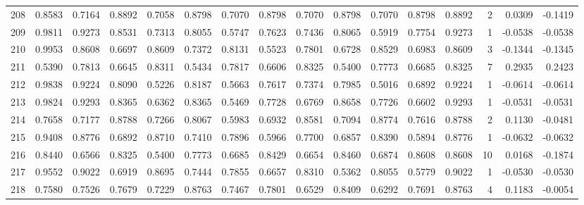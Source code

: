 \begin{tabular}{lrrrrrrrrrrrrrrr}
208 &      0.8583 &  0.7164 &  0.8892 &  0.7058 &  0.8798 &  0.7070 &  0.8798 &  0.7070 &  0.8798 &  0.7070 &   0.8798 &     0.8892 &      2 &                    0.0309 &                    -0.1419 \\
209 &      0.9811 &  0.9273 &  0.8531 &  0.7313 &  0.8055 &  0.5747 &  0.7623 &  0.7436 &  0.8065 &  0.5919 &   0.7754 &     0.9273 &      1 &                   -0.0538 &                    -0.0538 \\
210 &      0.9953 &  0.8608 &  0.6697 &  0.8609 &  0.7372 &  0.8131 &  0.5523 &  0.7801 &  0.6728 &  0.8529 &   0.6983 &     0.8609 &      3 &                   -0.1344 &                    -0.1345 \\
211 &      0.5390 &  0.7813 &  0.6645 &  0.8311 &  0.5434 &  0.7817 &  0.6606 &  0.8325 &  0.5400 &  0.7773 &   0.6685 &     0.8325 &      7 &                    0.2935 &                     0.2423 \\
212 &      0.9838 &  0.9224 &  0.8090 &  0.5226 &  0.8187 &  0.5663 &  0.7617 &  0.7374 &  0.7985 &  0.5016 &   0.6892 &     0.9224 &      1 &                   -0.0614 &                    -0.0614 \\
213 &      0.9824 &  0.9293 &  0.8365 &  0.6362 &  0.8365 &  0.5469 &  0.7728 &  0.6769 &  0.8658 &  0.7726 &   0.6602 &     0.9293 &      1 &                   -0.0531 &                    -0.0531 \\
214 &      0.7658 &  0.7177 &  0.8788 &  0.7266 &  0.8067 &  0.5983 &  0.6932 &  0.8581 &  0.7094 &  0.8774 &   0.7616 &     0.8788 &      2 &                    0.1130 &                    -0.0481 \\
215 &      0.9408 &  0.8776 &  0.6892 &  0.8710 &  0.7410 &  0.7896 &  0.5966 &  0.7700 &  0.6857 &  0.8390 &   0.5894 &     0.8776 &      1 &                   -0.0632 &                    -0.0632 \\
216 &      0.8440 &  0.6566 &  0.8325 &  0.5400 &  0.7773 &  0.6685 &  0.8429 &  0.6654 &  0.8460 &  0.6874 &   0.8608 &     0.8608 &     10 &                    0.0168 &                    -0.1874 \\
217 &      0.9552 &  0.9022 &  0.6919 &  0.8695 &  0.7444 &  0.7855 &  0.6657 &  0.8310 &  0.5362 &  0.8055 &   0.5779 &     0.9022 &      1 &                   -0.0530 &                    -0.0530 \\
218 &      0.7580 &  0.7526 &  0.7679 &  0.7229 &  0.8763 &  0.7467 &  0.7801 &  0.6529 &  0.8409 &  0.6292 &   0.7691 &     0.8763 &      4 &                    0.1183 &                    -0.0054 \\

\end{tabular}
